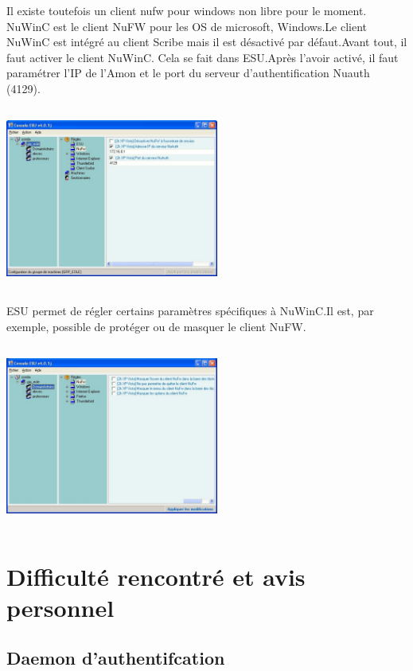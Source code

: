 \documentclass[12pt]{report}
\begin{document}
\begin{itemize}
\vspace{0,7cm}
Il existe toutefois un client nufw pour windows non libre pour le moment. NuWinC est le client NuFW pour les OS de microsoft, Windows.Le client NuWinC est intégré au client Scribe mais il est désactivé par défaut.Avant tout, il faut activer le client NuWinC. Cela se fait dans ESU.Après l'avoir activé, il faut paramétrer l'IP de l'Amon et le port du serveur d'authentification Nuauth (4129).
\begin{center}
  \includegraphics[width=7cm,height=6cm]{images/nuwinc.png}
\end{center}
\newpage
ESU permet de régler certains paramètres spécifiques à NuWinC.Il est, par exemple, possible de protéger ou de masquer le client NuFW.
\begin{center}
  \includegraphics[width=7cm,height=6cm]{images/nuwinc1.png}
\end{center}

\chapter{Difficulté rencontré et avis personnel}
\section{Daemon d'authentifcation}

\end{itemize}
\end{document}
